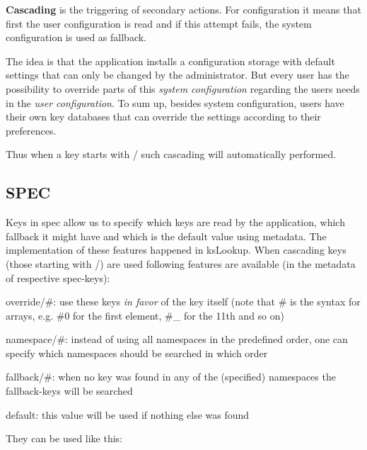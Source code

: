 {\bfseries Cascading} is the triggering of secondary actions. For configuration it means that first the user configuration is read and if this attempt fails, the system configuration is used as fallback.

The idea is that the application installs a configuration storage with default settings that can only be changed by the administrator. But every user has the possibility to override parts of this {\itshape system configuration} regarding the user\textquotesingle{}s needs in the {\itshape user configuration}. To sum up, besides system configuration, users have their own key databases that can override the settings according to their preferences.

Thus when a key starts with {\ttfamily /} such cascading will automatically performed.

\subsection*{S\+P\+EC}

Keys in {\ttfamily spec} allow us to specify which keys are read by the application, which fallback it might have and which is the default value using metadata. The implementation of these features happened in {\ttfamily ks\+Lookup}. When cascading keys (those starting with {\ttfamily /}) are used following features are available (in the metadata of respective {\ttfamily spec}-\/keys)\+:


\begin{DoxyItemize}
\item {\ttfamily override/\#}\+: use these keys {\itshape in favor} of the key itself (note that {\ttfamily \#} is the syntax for arrays, e.\+g. {\ttfamily \#0} for the first element, {\ttfamily \#\+\_} for the 11th and so on)
\item {\ttfamily namespace/\#}\+: instead of using all namespaces in the predefined order, one can specify which namespaces should be searched in which order
\item {\ttfamily fallback/\#}\+: when no key was found in any of the (specified) namespaces the {\ttfamily fallback}-\/keys will be searched
\item {\ttfamily default}\+: this value will be used if nothing else was found
\end{DoxyItemize}

They can be used like this\+:




